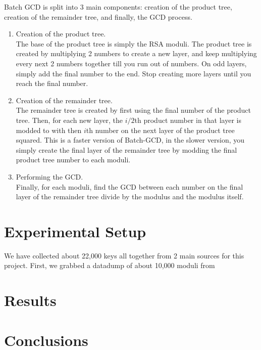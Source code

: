\documentclass[10pt, letterpaper]{article}
\begin{document}
Batch GCD is split into 3 main components: creation of the product tree, creation of the remainder tree, and finally, the GCD process.

\begin{enumerate}
\item Creation of the product tree. \\
  The base of the product tree is simply the RSA moduli. The product tree is created by multiplying 2 numbers to create a new layer, and keep multiplying every next 2 numbers together till you run out of numbers. On odd layers, simply add the final number to the end. Stop creating more layers until you reach the final number.
\item Creation of the remainder tree. \\
  The remainder tree is created by first using the final number of the product tree. Then, for each new layer, the $i/2$th product number in that layer is modded to with then $i$th number on the next layer of the product tree squared. This is a faster version of Batch-GCD, in the slower version, you simply create the final layer of the remainder tree by modding the final product tree number to each moduli.
\item Performing the GCD. \\
  Finally, for each moduli, find the GCD between each number on the final layer of the remainder tree divide by the modulus and the modulus itself.
\end{enumerate}

\section{Experimental Setup}
We have collected about 22,000 keys all together from 2 main sources for this project. First, we grabbed a datadump of about 10,000 moduli from 
\section{Results}

\section{Conclusions}
\end{document}
